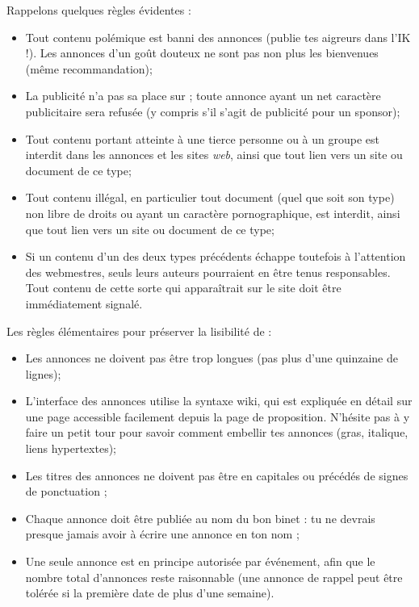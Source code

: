 Rappelons quelques r\`egles \'evidentes :
\begin{itemize}
 \item Tout contenu pol\'emique est banni des annonces (publie tes aigreurs dans l'IK !).
       Les annonces d'un go\^ut douteux ne sont pas non plus les bienvenues (m\^eme recommandation);
 \item La publicit\'e n'a pas sa place sur \fkz ; toute annonce ayant un net caract\`ere publicitaire
       sera refus\'ee (y compris s'il s'agit de publicit\'e pour un sponsor);
 \item Tout contenu portant atteinte \`a  une tierce personne ou \`a  un groupe est interdit dans les annonces
       et les sites \emph{web}, ainsi que tout lien vers un site ou document de ce type;
 \item Tout contenu ill\'egal, en particulier tout document (quel que soit son type)
       non libre de droits ou ayant un caract\`ere pornographique, est interdit,
       ainsi que tout lien vers un site ou document de ce type;
 \item Si un contenu d'un des deux types pr\'ec\'edents \'echappe toutefois \`a  l'attention des webmestres,
       seuls leurs auteurs pourraient en \^etre tenus responsables.
       Tout contenu de cette sorte qui appara\^itrait sur le site doit \^etre imm\'ediatement signal\'e.
\end{itemize}

Les r\`egles \'el\'ementaires pour pr\'eserver la lisibilit\'e de \fkz :
\begin{itemize}
 \item Les annonces ne doivent pas \^etre trop longues (pas plus d'une quinzaine de lignes);
 \item L'interface des annonces utilise la syntaxe wiki, qui est expliqu\'ee en d\'etail sur une page accessible facilement depuis la page de proposition. N'h\'esite pas \`a  y faire un petit tour pour savoir comment embellir tes annonces (gras, italique, liens hypertextes);
 \item Les titres des annonces ne doivent pas \^etre en capitales ou pr\'ec\'ed\'es de signes de ponctuation ;
 \item Chaque annonce doit \^etre publi\'ee au nom du bon binet : tu ne devrais presque jamais avoir \`a \'ecrire une annonce en ton nom ;
 \item Une seule annonce est en principe autoris\'ee par \'ev\'enement, afin que le nombre total d'annonces reste raisonnable (une annonce de rappel peut \^etre tol\'er\'ee si la premi\`ere date de plus d'une semaine).
\end{itemize}

